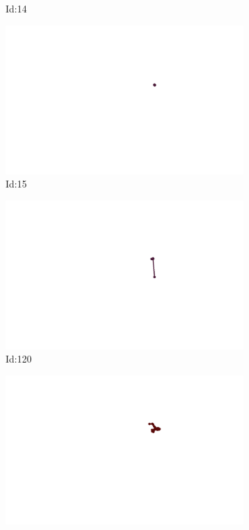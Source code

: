 \documentclass[12pt,twoside]{report}
\begin{document}
\begin{figure}
\begin{subfigure}[b]{0.20\textwidth}
\caption{Id:14}
\end{subfigure}
\begin{subfigure}[b]{0.20\textwidth}
\centering
\includegraphics[width=\textwidth]{../../trajectories/15.png}
\caption{Id:15}
\end{subfigure}
\begin{subfigure}[b]{0.20\textwidth}
\centering
\includegraphics[width=\textwidth]{../../trajectories/120.png}
\caption{Id:120}
\end{subfigure}
\begin{subfigure}[b]{0.20\textwidth}
\centering
\includegraphics[width=\textwidth]{../../trajectories/124.png}

\end{subfigure}
\end{figure}
\end{document}
